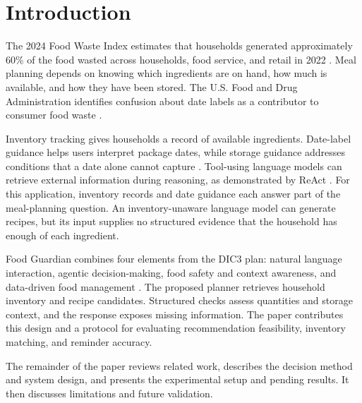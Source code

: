 \section{Introduction}
The 2024 Food Waste Index estimates that households generated approximately 60\% of the food wasted across households, food service, and retail in 2022 \cite{unep2024}. Meal planning depends on knowing which ingredients are on hand, how much is available, and how they have been stored. The U.S. Food and Drug Administration identifies confusion about date labels as a contributor to consumer food waste \cite{fdafoodwaste}.

Inventory tracking gives households a record of available ingredients. Date-label guidance helps users interpret package dates, while storage guidance addresses conditions that a date alone cannot capture \cite{fdafoodwaste}. Tool-using language models can retrieve external information during reasoning, as demonstrated by ReAct \cite{yao2023}. For this application, inventory records and date guidance each answer part of the meal-planning question. An inventory-unaware language model can generate recipes, but its input supplies no structured evidence that the household has enough of each ingredient.

Food Guardian combines four elements from the DIC3 plan: natural language interaction, agentic decision-making, food safety and context awareness, and data-driven food management \cite{dic3plan}. The proposed planner retrieves household inventory and recipe candidates. Structured checks assess quantities and storage context, and the response exposes missing information. The paper contributes this design and a protocol for evaluating recommendation feasibility, inventory matching, and reminder accuracy.

The remainder of the paper reviews related work, describes the decision method and system design, and presents the experimental setup and pending results. It then discusses limitations and future validation.
